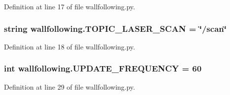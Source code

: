Definition at line 17 of file wallfollowing.\+py.

\subsubsection[{\texorpdfstring{T\+O\+P\+I\+C\+\_\+\+L\+A\+S\+E\+R\+\_\+\+S\+C\+AN}{TOPIC_LASER_SCAN}}]{\setlength{\rightskip}{0pt plus 5cm}string wallfollowing.\+T\+O\+P\+I\+C\+\_\+\+L\+A\+S\+E\+R\+\_\+\+S\+C\+AN = \char`\"{}/scan\char`\"{}}\hypertarget{namespacewallfollowing_a7e38e617465ebdfa7ec0576ac63443f8}{}\label{namespacewallfollowing_a7e38e617465ebdfa7ec0576ac63443f8}


Definition at line 18 of file wallfollowing.\+py.

\subsubsection[{\texorpdfstring{U\+P\+D\+A\+T\+E\+\_\+\+F\+R\+E\+Q\+U\+E\+N\+CY}{UPDATE_FREQUENCY}}]{\setlength{\rightskip}{0pt plus 5cm}int wallfollowing.\+U\+P\+D\+A\+T\+E\+\_\+\+F\+R\+E\+Q\+U\+E\+N\+CY = 60}\hypertarget{namespacewallfollowing_a7ba7bea964894fd6f3def270bd3afa43}{}\label{namespacewallfollowing_a7ba7bea964894fd6f3def270bd3afa43}


Definition at line 29 of file wallfollowing.\+py.

